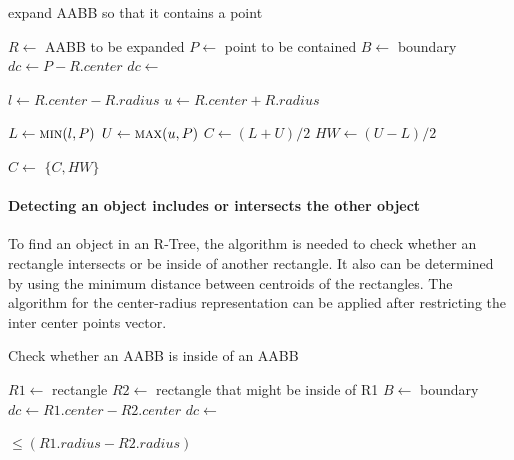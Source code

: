 \documentclass[10pt,letterpaper,twocolumn]{article}
\begin{document}
\begin{algorithm}[htb]
    \caption{expand AABB so that it contains a point}
    \label{expand_aabb_point}
    \begin{algorithmic}
        \State $R \gets$ AABB to be expanded
        \State $P \gets$ point to be contained
        \State $B \gets$ boundary
            \State $dc \gets P - R.center$
            \State $dc \gets$ 

            \State $l \gets R.center - R.radius$
            \State $u \gets R.center + R.radius$

            \State $L  \gets \Call{min}{l, P}$
            \State $U  \gets \Call{max}{u, P}$
            \State $C  \gets (L + U) / 2$
            \State $HW \gets (U - L) / 2$

            \State $C \gets$ 
            \State \Return $\{C, HW\}$
        \EndFunction
     \end{algorithmic}
\end{algorithm}



\paragraph{Detecting an object includes or intersects the other object}

To find an object in an R-Tree, the algorithm is needed to check whether an
rectangle intersects or be inside of another rectangle.
It also can be determined by using the minimum distance between centroids of the
rectangles.
The algorithm for the center-radius representation can be applied after
restricting the inter center points vector.

\begin{algorithm}[tbh]
    \caption{Check whether an AABB is inside of an AABB}
    \begin{algorithmic}
        \State $R1 \gets$ rectangle
        \State $R2 \gets$ rectangle that might be inside of R1
        \State $B  \gets$ boundary
            \State $dc \gets R1.center - R2.center$
            \State $dc \gets$ 

            \State \Return {} $\leq (R1.radius - R2.radius)$
        \EndFunction
     \end{algorithmic}
\end{algorithm}
\end{document}

